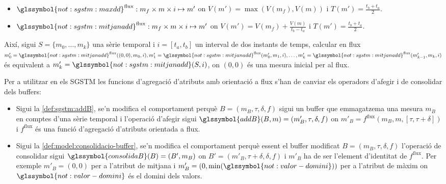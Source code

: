 \begin{itemize}
\item $\glssymbol{not:sgstm:maxdd}^\text{flux}: m_f \times m \times i \mapsto
  m'$ on $V(m')=\max(V(m_f),V(m))$ i $T(m')=\frac{t_b+t_a}{2}$. 


\item $\glssymbol{not:sgstm:mitjanadd}^\text{flux}: m_f \times m
  \times i \mapsto m'$ on $V(m') = V(m_f) + \frac{V(m)}{t_b-t_a}$ i
  $T(m')=\frac{t_b+t_a}{2}$.

\end{itemize}


Així, sigui $S=\{m_0,\dotsc,m_k\}$ una sèrie temporal i $i=[t_a,t_b]$
un interval de dos instants de temps, calcular en flux $m'_0 =
\glssymbol{not:sgstm:mitjanadd}^\text{flux}((0,0),m_0,i), m'_1 =
\glssymbol{not:sgstm:mitjanadd}^\text{flux}(m'_0,m_1,i), \dotsc, m'_k
= \glssymbol{not:sgstm:mitjanadd}^\text{flux}(m'_{k-1},m_k,i)$ és
equivalent a $m_k'=\glssymbol{not:sgstm:mitjanadd}(S,i)$, on $(0,0)$
és una mesura inicial per al flux.




Per a utilitzar en els \gls{SGSTM} les funcions d'agregació d'atributs
amb orientació a flux s'han de canviar els operadors d'afegir i de
consolidar dels buffers:



\begin{itemize}
\item Sigui la \autoref{def:sgstm:addB}, se'n modifica el comportament
  perquè $B=(m_B,\tau,\delta,f)$ sigui un buffer que emmagatzema una
  mesura $m_B$ en comptes d'una sèrie temporal i l'operació d'afegir
  sigui $\glssymbol{addB}(B,m)= (m'_B,\tau,\delta,f)$ on $m'_B =
  f^\text{flux}(m_B,m,[\tau,\tau+\delta])$ i $f^\text{flux}$ és una
  funció d'agregació d'atributs orientada a flux.


\item Sigui la \autoref{def:model:consolidacio-buffer}, se'n modifica
  el comportament perquè essent el buffer modificat
  $B=(m_B,\tau,\delta,f)$ l'operació de consolidar sigui
  $\glssymbol{consolidaB}(B) = (B',m_B)$ on
  $B'=(m'_B,\tau+\delta,\delta,f)$ i $m'_B$ ha de ser l'element
  d'identitat de $f^\text{flux}$. Per exemple $m'_B=(0,0)$ per a l'atribut
  de mitjana i $m'_B=(0,\min(\glssymbol{not:valor-domini}))$ per a
  l'atribut de màxim on $\glssymbol{not:valor-domini}$ és el domini
  dels valors. 

\end{itemize}

